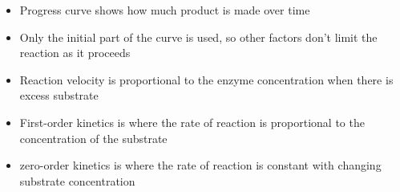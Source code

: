\begin{itemize}
	\item Progress curve shows how much product is made over time
	\item Only the initial part of the curve is used, so other factors don't limit the reaction as it proceeds
	\item Reaction velocity is proportional to the enzyme concentration when there is excess substrate
	\item First-order kinetics is where the rate of reaction is proportional to the concentration of the substrate
	\item zero-order kinetics is where the rate of reaction is constant with changing substrate concentration
\end{itemize}
